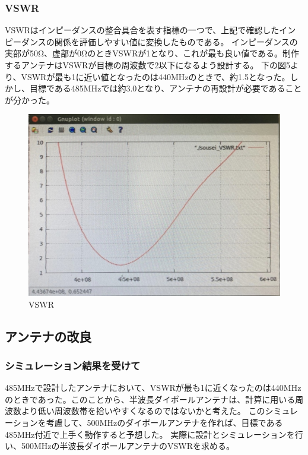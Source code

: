 \documentclass[dvipdfmx,autodetect-engine,titlepage]{jsarticle}
\begin{document}
\subsubsection{VSWR}
VSWRはインピーダンスの整合具合を表す指標の一つで、上記で確認したインピーダンスの関係を評価しやすい値に変換したものである。
インピーダンスの実部が50Ω、虚部が0ΩのときVSWRが1となり、これが最も良い値である。制作するアンテナはVSWRが目標の周波数で2以下になるよう設計する。
下の図5より、VSWRが最も1に近い値となったのは440MHzのときで、約1.5となった。しかし、目標である485MHzでは約3.0となり、アンテナの再設計が必要であることが分かった。\\
\begin{figure}[H]
  \centering
  \includegraphics[scale=0.2]{fg8.jpg}
  \caption{VSWR}\label{fig:図5}
\end{figure}

\subsection{アンテナの改良}
\subsubsection{シミュレーション結果を受けて}
485MHzで設計したアンテナにおいて、VSWRが最も1に近くなったのは440MHzのときであった。このことから、半波長ダイポールアンテナは、計算に用いる周波数より低い周波数帯を拾いやすくなるのではないかと考えた。
このシミュレーションを考慮して、500MHzのダイポールアンテナを作れば、目標である485MHz付近で上手く動作すると予想した。
実際に設計とシミュレーションを行い、500MHzの半波長ダイポールアンテナのVSWRを求める。\\\\
\end{document}
